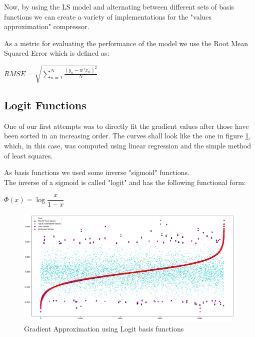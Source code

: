     \newpage
    Now, by using the LS  model and alternating between different sets of basis functions
    we can create a variety of implementations for the "values approximation" compressor.
    
    As a metric for evaluating the performance of the model we use the Root Mean Squared Error
    which is defined as:
    \begin{flushleft}
    \centering
    \setlength{\parindent}{40ex} 
    $RMSE = \sqrt{\sum_{n=1}^N{\frac{(y_n-w^T x_n)^2}{N}}} $
    \end{flushleft}
    
    \subsection{Logit Functions}

    One of our first attempts was to directly fit the gradient values after those have been sorted in an increasing order.
    The curves shall look like the one in figure \ref{logit}, which, in this case, was computed using linear regression and the simple method of least squares.
    
    As basis functions we used some inverse "sigmoid" functions. \\
    The inverse of a sigmoid is called "logit" and has the following functional form:
    \begin{flushleft}
    \centering
    \setlength{\parindent}{40ex} 
    $\Phi{(x)} = \log{\dfrac{x}{1-x}} $
    \end{flushleft}
    

    \begin{figure}[h]
    \centering
    \includegraphics[width=1\textwidth]{figures/24gradient.png}
    \caption{Gradient Approximation using Logit basis functions}
    \label{logit}
    \end{figure}

